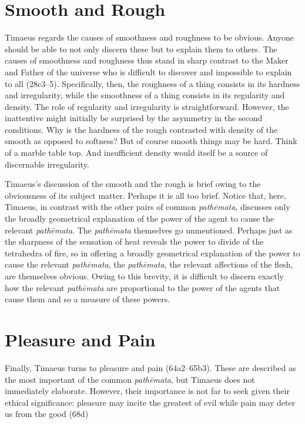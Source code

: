 
\section{Smooth and Rough} %
\label{sec:smooth_and_rough}

Timaeus regards the causes of smoothness and roughness to be obvious. Anyone should be able to not only discern these but to explain them to others. The causes of smoothness and roughness thus stand in sharp contrast to the Maker and Father of the universe who is difficult to discover and impossible to explain to all (28c3--5). Specifically, then, the roughness of a thing consists in its hardness and irregularity, while the smoothness of a thing consists in its regularity and density. The role of regularity and irregularity is straightforward. However, the inattentive might initially be surprised by the asymmetry in the second conditions. Why is the hardness of the rough contrasted with density of the smooth as opposed to softness? But of course smooth things may be hard. Think of a marble table top. And insufficient density would itself be a source of discernable irregularity.

Timaeus's discussion of the smooth and the rough is brief owing to the obviousness of its subject matter. Perhaps it is all too brief. Notice that, here, Timaeus, in contrast with the other pairs of common \emph{pathēmata}, discusses only the broadly geometrical explanation of the power of the agent to cause the relevant \emph{pathēmata}. The \emph{pathēmata} themselves go unmentioned. Perhaps just as the sharpness of the sensation of heat reveals the power to divide of the tetrahedra of fire, so in offering a broadly geometrical explanation of the power to cause the relevant \emph{pathēmata}, the \emph{pathēmata}, the relevant affections of the flesh, are themselves obvious. Owing to this brevity, it is difficult to discern exactly how the relevant \emph{pathēmata} are proportional to the power of the agents that cause them and so a measure of these powers.


\section{Pleasure and Pain} %
\label{sec:pleasure_and_pain}

Finally, Timaeus turns to pleasure and pain (64a2–65b3). These are described as the most important of the common \emph{pathēmata}, but Timaeus does not immediately elaborate. However, their importance is not far to seek given their ethical significance: pleasure may incite the greatest of evil while pain may deter us from the good (68d)

